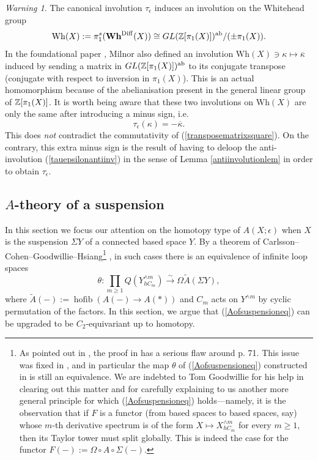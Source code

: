 \documentclass[a4paper, oneside]{amsart}
\newcommand{\diff}{\mathrm{Diff}}
\newcommand{\hofib}{\operatorname{hofib}}
\newcommand{\1}{\mathds{1}}
\theoremstyle{remark}
\newtheorem{warn}[thm]{Warning}
\theoremstyle{definition}
\newcommand{\Z}{{\scaleobj{0.97}{\mathbb{Z}}}}
\newcommand{\Wh}{\mathrm{Wh}}
\newcommand{\Whsp}{\mathbf{Wh}^{\diff}}
\numberwithin{equation}{section}
\begin{document}
\begin{warn}\label{Milnorinvolutionwarning}
    The canonical involution $\tau_{\epsilon}$ induces an involution on the Whitehead group 
    $$\Wh(X):=\pi_1^s(\Whsp(X))\cong GL(\Z[\pi_1(X)])^{\mathrm{ab}}/(\pm \pi_1(X)).$$ 
    In the foundational paper \cite{MilnorWhiteheadTorsion}, Milnor also defined an involution $\Wh(X)\ni\kappa\mapsto \overline\kappa$ induced by sending a matrix in $GL(\Z[\pi_1(X)])^{\mathrm{ab}}$ to its conjugate transpose (conjugate with respect to inversion in $\pi_1(X)$). This is an actual homomorphism because of the abelianisation present in the general linear group of $\Z[\pi_1(X)]$. It is worth being aware that these two involutions on $\Wh(X)$ are only the same after introducing a minus sign, i.e. 
    \begin{equation}\label{Milnorinvrelation}
\tau_\epsilon(\kappa)=-\overline{\kappa}.
    \end{equation}
This does \textit{not} contradict the commutativity of (\ref{transposematrixsquare}). On the contrary, this extra minus sign is the result of having to deloop the anti-involution (\ref{tauepsilonantiinv}) in the sense of Lemma \ref{antiinvolutionlem} in order to obtain $\tau_\epsilon$.  
\end{warn}






\subsection{$A$-theory of a suspension}
In this section we focus our attention on the homotopy type of $A(X;\epsilon)$ when $X$ is the suspension $\Sigma Y$ of a connected based space $Y$. By a theorem of Carlsson--Cohen--Goodwillie--Hsiang\footnote{As pointed out in \cite[p. 543]{AvsTC}, the proof in \cite{Atheorysuspension} has a serious flaw around p. 71. This issue was fixed in \cite[Cor. 4.15]{AvsTC}, and in particular the map $\theta$ of (\ref{Aofsuspensioneq}) constructed in \cite[\S 1]{Atheorysuspension} is still an equivalence. We are indebted to Tom Goodwillie for his help in clearing out this matter and for carefully explaining to us another more general principle for which (\ref{Aofsuspensioneq}) holds---namely, it is the observation that if $F$ is a functor (from based spaces to based spaces, say) whose $m$-th derivative spectrum is of the form $ X\mapsto X^{\wedge m}_{hC_m}$ for every $m\geq 1$, then its Taylor tower must split globally. This is indeed the case for the functor $F(-):= \Omega\circ A\circ \Sigma(-)$.} \cite[Thm. 3]{Atheorysuspension}, in such cases there is an equivalence of infinite loop spaces
\begin{equation}\label{Aofsuspensioneq}
    \theta: \prod_{m\geq 1} Q(Y^{\wedge m}_{hC_m})\overset{\sim}{\longrightarrow} \Omega \widetilde{A}(\Sigma Y),
\end{equation}
where $\widetilde{A}(-):=\hofib(A(-)\to A(*))$ and $C_m$ acts on $Y^{\wedge m}$ by cyclic permutation of the factors. In this section, we argue that (\ref{Aofsuspensioneq}) can be upgraded to be $C_2$-equivariant up to homotopy. 
\end{document}
